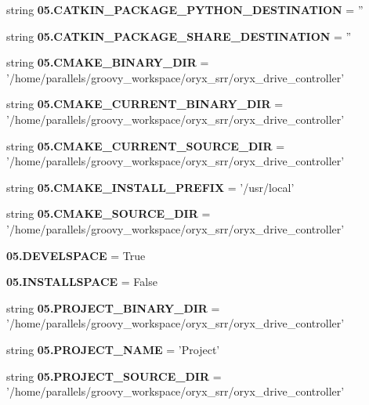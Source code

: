 \begin{DoxyCompactItemize}
\item 
string {\bf 05.\-C\-A\-T\-K\-I\-N\-\_\-\-P\-A\-C\-K\-A\-G\-E\-\_\-\-P\-Y\-T\-H\-O\-N\-\_\-\-D\-E\-S\-T\-I\-N\-A\-T\-I\-O\-N} = ''
\item 
string {\bf 05.\-C\-A\-T\-K\-I\-N\-\_\-\-P\-A\-C\-K\-A\-G\-E\-\_\-\-S\-H\-A\-R\-E\-\_\-\-D\-E\-S\-T\-I\-N\-A\-T\-I\-O\-N} = ''
\item 
string {\bf 05.\-C\-M\-A\-K\-E\-\_\-\-B\-I\-N\-A\-R\-Y\-\_\-\-D\-I\-R} = '/home/parallels/groovy\-\_\-workspace/oryx\-\_\-srr/oryx\-\_\-drive\-\_\-controller'
\item 
string {\bf 05.\-C\-M\-A\-K\-E\-\_\-\-C\-U\-R\-R\-E\-N\-T\-\_\-\-B\-I\-N\-A\-R\-Y\-\_\-\-D\-I\-R} = '/home/parallels/groovy\-\_\-workspace/oryx\-\_\-srr/oryx\-\_\-drive\-\_\-controller'
\item 
string {\bf 05.\-C\-M\-A\-K\-E\-\_\-\-C\-U\-R\-R\-E\-N\-T\-\_\-\-S\-O\-U\-R\-C\-E\-\_\-\-D\-I\-R} = '/home/parallels/groovy\-\_\-workspace/oryx\-\_\-srr/oryx\-\_\-drive\-\_\-controller'
\item 
string {\bf 05.\-C\-M\-A\-K\-E\-\_\-\-I\-N\-S\-T\-A\-L\-L\-\_\-\-P\-R\-E\-F\-I\-X} = '/usr/local'
\item 
string {\bf 05.\-C\-M\-A\-K\-E\-\_\-\-S\-O\-U\-R\-C\-E\-\_\-\-D\-I\-R} = '/home/parallels/groovy\-\_\-workspace/oryx\-\_\-srr/oryx\-\_\-drive\-\_\-controller'
\item 
{\bf 05.\-D\-E\-V\-E\-L\-S\-P\-A\-C\-E} = \-True
\item 
{\bf 05.\-I\-N\-S\-T\-A\-L\-L\-S\-P\-A\-C\-E} = \-False
\item 
string {\bf 05.\-P\-R\-O\-J\-E\-C\-T\-\_\-\-B\-I\-N\-A\-R\-Y\-\_\-\-D\-I\-R} = '/home/parallels/groovy\-\_\-workspace/oryx\-\_\-srr/oryx\-\_\-drive\-\_\-controller'
\item 
string {\bf 05.\-P\-R\-O\-J\-E\-C\-T\-\_\-\-N\-A\-M\-E} = '\-Project'
\item 
string {\bf 05.\-P\-R\-O\-J\-E\-C\-T\-\_\-\-S\-O\-U\-R\-C\-E\-\_\-\-D\-I\-R} = '/home/parallels/groovy\-\_\-workspace/oryx\-\_\-srr/oryx\-\_\-drive\-\_\-controller'
\end{DoxyCompactItemize}
